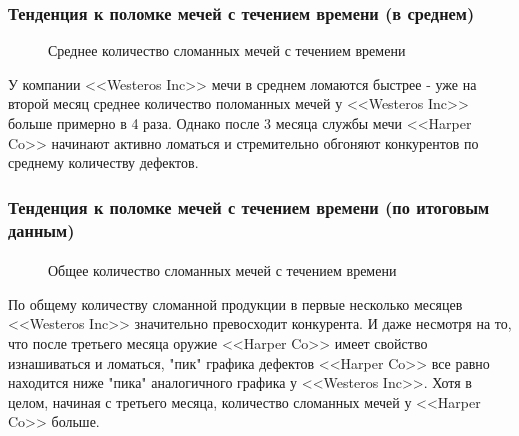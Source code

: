 \documentclass[10pt,pdf,hyperref={unicode}]{beamer}
\begin{document}
\begin{frame}
\frametitle{Тенденция к поломке мечей с течением времени (в среднем)} 
\begin{minipage}{0.4\textwidth}
 	\begin{figure}[L]
		\caption{Среднее количество сломанных мечей с течением времени}
	\end{figure}
\end{minipage}
\hfill
\begin{minipage}{0.4\textwidth}
	У компании <<Westeros Inc>> мечи в среднем ломаются быстрее - уже на второй месяц среднее количество поломанных мечей у <<Westeros Inc>> больше примерно в 4 раза. 
	Однако после 3 месяца службы мечи <<Harper Co>> начинают активно ломаться и стремительно обгоняют конкурентов по среднему количеству дефектов. 
\end{minipage}
\end{frame}

\begin{frame}
\frametitle{Тенденция к поломке мечей с течением времени (по итоговым данным)} 
\framesubtitle{}

\begin{minipage}{0.4\textwidth}
 	\begin{figure}[L]
		\caption{Общее количество сломанных мечей с течением времени}	
	\end{figure}
\end{minipage}
\hfill
\begin{minipage}{0.4\textwidth}
	По общему количеству сломанной продукции в первые несколько месяцев <<Westeros Inc>> значительно превосходит конкурента. 
	И даже несмотря на то, что после третьего месяца оружие <<Harper Co>> имеет свойство изнашиваться и ломаться, "пик" графика дефектов <<Harper Co>> все равно находится ниже "пика" аналогичного графика у <<Westeros Inc>>. Хотя в целом, начиная с третьего месяца, количество сломанных мечей у <<Harper Co>> больше.    
\end{minipage}
\end{frame}
\end{document}
